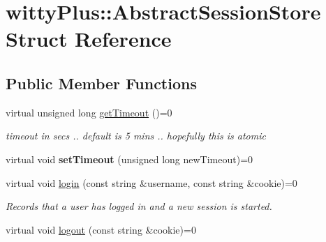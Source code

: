 \hypertarget{structwittyPlus_1_1AbstractSessionStore}{
\section{wittyPlus::AbstractSessionStore Struct Reference}
\label{structwittyPlus_1_1AbstractSessionStore}
}
\subsection*{Public Member Functions}
\begin{DoxyCompactItemize}
\item 
\hypertarget{structwittyPlus_1_1AbstractSessionStore_a24e0f486039c7cf663e0608d7c766f5d}{
virtual unsigned long \hyperlink{structwittyPlus_1_1AbstractSessionStore_a24e0f486039c7cf663e0608d7c766f5d}{getTimeout} ()=0}
\label{structwittyPlus_1_1AbstractSessionStore_a24e0f486039c7cf663e0608d7c766f5d}

\begin{DoxyCompactList}\small\item\em timeout in secs .. default is 5 mins .. hopefully this is atomic \item\end{DoxyCompactList}\item 
\hypertarget{structwittyPlus_1_1AbstractSessionStore_a6d227cfd16a97ca2998c30ce5055824c}{
virtual void {\bfseries setTimeout} (unsigned long newTimeout)=0}
\label{structwittyPlus_1_1AbstractSessionStore_a6d227cfd16a97ca2998c30ce5055824c}

\item 
\hypertarget{structwittyPlus_1_1AbstractSessionStore_add1d5ff9068f88dcdf6b98604f00e927}{
virtual void \hyperlink{structwittyPlus_1_1AbstractSessionStore_add1d5ff9068f88dcdf6b98604f00e927}{login} (const string \&username, const string \&cookie)=0}
\label{structwittyPlus_1_1AbstractSessionStore_add1d5ff9068f88dcdf6b98604f00e927}

\begin{DoxyCompactList}\small\item\em Records that a user has logged in and a new session is started. \item\end{DoxyCompactList}\item 
\hypertarget{structwittyPlus_1_1AbstractSessionStore_a5c11eb01c20f7a9db29d9402c3dbfe0f}{
virtual void \hyperlink{structwittyPlus_1_1AbstractSessionStore_a5c11eb01c20f7a9db29d9402c3dbfe0f}{logout} (const string \&cookie)=0}
\label{structwittyPlus_1_1AbstractSessionStore_a5c11eb01c20f7a9db29d9402c3dbfe0f}


\end{DoxyCompactItemize}
